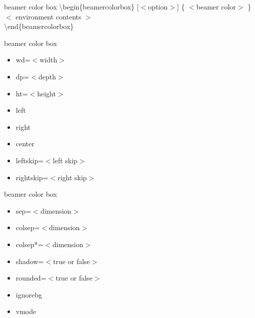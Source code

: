 \documentclass[10pt,blue,xcolor=pdftex,dvipsnames,table,handout]{beamer}
\begin{document}

		\begin{frame}[plain]
		\end{frame}


		\begin{frame}[allowframebreaks]

		\null
		\begin{block} {beamer color box}
			\textbackslash begin\{beamercolorbox\} [$<$option$>$] \{ $<$beamer color$>$ \}\\
			$<$ environment contents $>$ \\
			\textbackslash end\{beamercolorbox\}
		\end{block}

		\newpage \null
		\begin{block} {beamer color box}
			\begin{itemize}	
			\item	wd=$<$width$>$
			\item	dp=$<$depth$>$
			\item	ht=$<$height$>$
			\item	left
			\item	right
			\item	center
			\item	leftskip=$<$left skip$>$
			\item	rightskip=$<$right skip$>$
			\end{itemize}
		\end{block}

		\newpage \null
		\begin{block} {beamer color box}
			\begin{itemize}	
			\item	sep=$<$dimension$>$
			\item	colsep=$<$dimension$>$
			\item	colsep*=$<$dimension$>$
			\item	shadow=$<$true or false$>$
			\item	rounded=$<$true or false$>$
			\item	ignorebg
			\item	vmode
			\end{itemize}
		\end{block}

		\end{frame}
\end{document}
